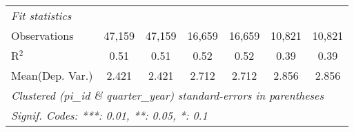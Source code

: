 \begin{tabular}{lcccccc}
   \midrule
   \emph{Fit statistics}\\
   Observations                                                & 47,159        & 47,159        & 16,659         & 16,659         & 10,821      & 10,821\\  
   R$^2$                                                       & 0.51          & 0.51          & 0.52           & 0.52           & 0.39        & 0.39\\  
Mean(Dep. Var.) & 2.421 & 2.421 & 2.712 & 2.712 & 2.856 & 2.856 \\
   \midrule \midrule
   \multicolumn{7}{l}{\emph{Clustered (pi\_id \& quarter\_year) standard-errors in parentheses}}\\
   \multicolumn{7}{l}{\emph{Signif. Codes: ***: 0.01, **: 0.05, *: 0.1}}\\
\end{tabular}
\par\endgroup
